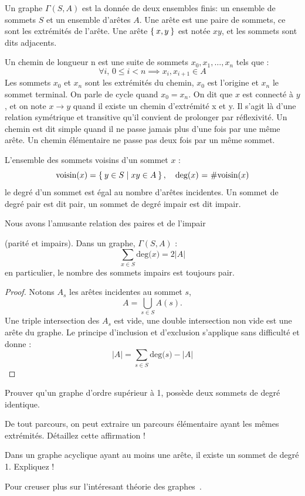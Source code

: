\begin{defi}
  Un graphe $\Gamma(S, A)$ est la donnée de deux ensembles finis: un ensemble de
  sommets $S$ et un ensemble d’arêtes $A$. Une arête est une paire de sommets,
  ce sont les extrémités de l’arête. Une arête $\Set{x, y}$ est notée $xy$,
  et les sommets sont dits adjacents.
\end{defi}
\begin{defi}
  Un chemin de longueur n est une suite de  sommets $x_0, x_1, \dots , x_n$
  tels que :
  \[
  \forall i,\, 0 \leq i < n \implies x_i, x_{i+1} \in A
  \]
  Les sommets $x_0$ et $x_n$ sont les extrémités du chemin, $x_0$ est l’origine
et $x_n$ le sommet terminal. On parle de cycle quand $x_0 = x_n$. On dit
que $x$ est connecté à $y$, et on note $x \to y$ quand il existe un chemin
d’extrémité x et y. Il s’agit là d’une relation symétrique et transitive
qu’il convient de prolonger par réflexivité. Un chemin est dit simple
quand il ne passe jamais plus d’une fois par une même arête. Un chemin
élémentaire ne passe pas deux fois par un même sommet.
\end{defi}
\begin{defi}
L’ensemble des sommets voisins d’un sommet $x$ :
\[
\text{voisin($x$)} = \Set{ y \in S | xy \in A },\quad \text{deg($x$) = $\#$voisin($x$)}
\]
le degré d’un sommet est égal au nombre d’arêtes incidentes. Un
sommet de degré pair est dit pair, un sommet de degré impair est
dit impair.
\end{defi}
Nous avons l’amusante relation des paires et de l’impair
\begin{lemme}
  (parité et impairs). Dans un graphe, $\Gamma(S, A)$ :
  \[
  \sum_{x \in S} \text{deg($x$)} = 2 \lvert A \rvert
  \]
  en particulier, le nombre des sommets impairs est toujours pair.
\end{lemme}
\begin{proof}
  Notons $A_s$ les arêtes incidentes au sommet $s$,
  \[
  A = \bigcup_{s \in S} A(s).
  \]
Une triple intersection des $A_s$ est vide, une double intersection non
vide est une arête du graphe. Le principe d’inclusion et d’exclusion  s’applique sans difficulté et donne :
\[
\lvert A \rvert = \sum_{s \in S} \text{deg($s$)} - \lvert A \rvert
\]
\end{proof}
\begin{exo}
Prouver qu’un graphe d’ordre supérieur à 1, possède deux sommets de degré identique.
\end{exo}
\begin{exo}
 De tout parcours, on peut extraire un parcours élémentaire
ayant les mêmes extrémités. Détaillez cette affirmation !
\end{exo}
\begin{exo}
 Dans un graphe acyclique ayant au moins une arête, il existe un sommet de degré 1. Expliquez !
\end{exo}
Pour creuser plus sur l'intéresant théorie des graphes~\cite{langevin.book}.

